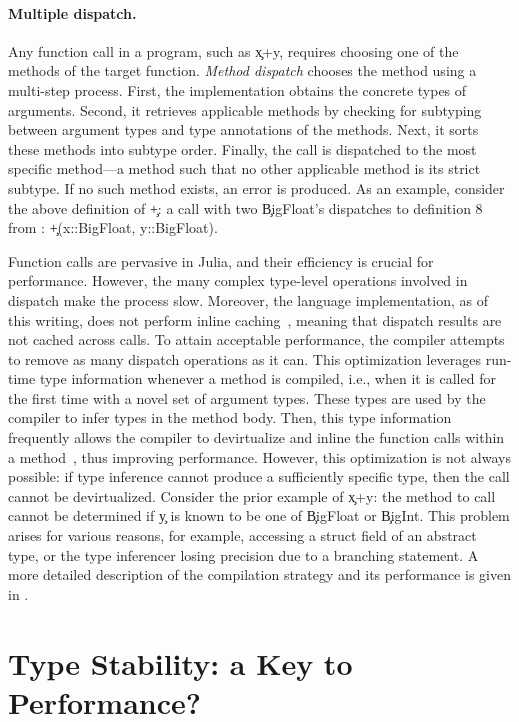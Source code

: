 \paragraph*{Multiple dispatch.}
Any function call in a program, such as \c{x+y}, requires choosing one of the
methods of the target function. \emph{Method dispatch} chooses the method using
a multi-step process.
First, the implementation obtains the concrete types of arguments. Second, it
retrieves applicable methods by checking for subtyping between argument types
and type annotations of the methods. Next, it sorts these methods into subtype
order. Finally, the call is dispatched to the most specific method---a method
such that no other applicable method is its strict subtype. If no such
method exists, an error is produced. As an example, consider the above
definition of \c{+}: a call with two \c{BigFloat}'s dispatches to
definition 8 from : \c{+(x::BigFloat, y::BigFloat)}.

Function calls are pervasive in Julia, and their efficiency is crucial for
performance. However, the many complex type-level operations involved in dispatch
make the process slow. Moreover, the language implementation, as of this writing,
does not perform inline caching~\cite{DS84}, meaning that dispatch results are
not cached across calls. To attain acceptable performance, the compiler attempts
to remove as many dispatch operations as it can. This optimization leverages
run-time type information whenever a method is compiled, i.e., when it is called
for the first time with a novel set of argument types.  These types are used by
the compiler to infer types in the method body. Then, this type information
frequently allows the compiler to devirtualize and inline the function calls
within a method~\cite{aigner}, thus improving performance. However, this
optimization is not always possible: if type inference cannot produce a
sufficiently specific type, then the call cannot be devirtualized. Consider the
prior example of \c{x+y}: the method to call cannot be determined
if \c{y} is known to be one of \c{BigFloat} or \c{BigInt}. This problem arises for
various reasons, for example, accessing a struct field of an abstract type, or
the type inferencer losing precision due to a branching statement. A more
detailed description of the compilation strategy and its performance is given in
\cite{oopsla18a}.

\section{Type Stability: a Key to Performance?}%
\label{sec:stability}


